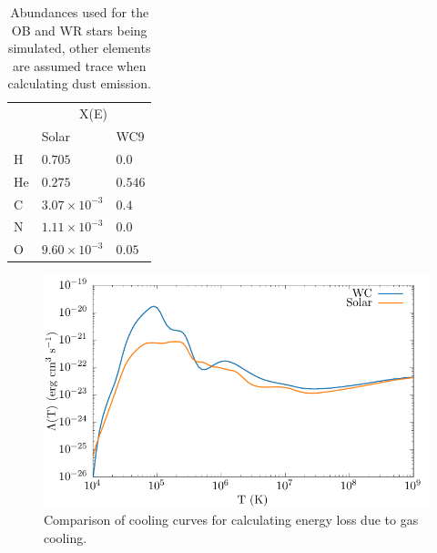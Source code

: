 \documentclass[fleqn,usenatbib]{mnras}
\begin{document}
\begin{table}
  \centering
  \begin{tabular}{@{}lll@{}}
  \toprule
  \multicolumn{1}{l}{} & \multicolumn{2}{c}{X(E)} \\ \cmidrule(l){2-3} 
   & Solar & WC9 \\ \midrule
  H & $0.705$ & $0.0$ \\
  He & $0.275$ & $0.546$ \\
  C & $3.07 \times 10^{-3}$ & $0.4$ \\
  N & $1.11 \times 10^{-3}$ & $0.0$ \\
  O & $9.60 \times 10^{-3}$ & $0.05$ \\
  \hline
  \end{tabular}
  \caption[Abundances used for OB and WR stars]{Abundances used for the OB and WR stars being simulated, other elements are assumed trace when calculating dust emission.}
  \label{tab:abundances}
\end{table}


\begin{figure}
  \centering
  \includegraphics[width=\linewidth]{assets/cooling-curve/cooling-curve-no-elements.pdf}
  \caption[WR and OB $\Lambda(T)$ cooling curves]{Comparison of cooling curves for calculating energy loss due to gas cooling.}
  \label{fig:cooling-curve}
\end{figure}
\end{document}
